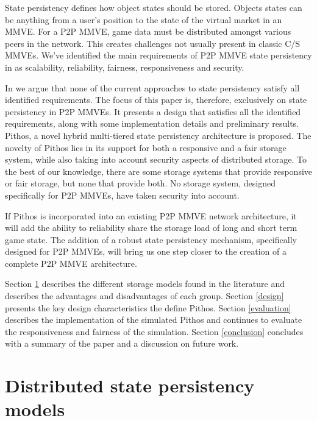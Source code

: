 \documentclass[10pt,a4paper,conference]{IEEEtran}
\begin{document}
State persistency defines how object states should be stored. Objects states can be anything from a user's position to the state of the virtual
market in an MMVE. For a P2P MMVE, game data must be distributed amongst various peers in the network. This creates challenges not usually present in
classic C/S MMVEs. We've identified the main requirements of P2P MMVE state persistency in \cite{gilmore_p2p_mmog_state_persistency} as scalability,
reliability, fairness, responsiveness and security.

In \cite{gilmore_p2p_mmog_state_persistency} we argue that none of the current approaches to state persistency satisfy all identified requirements.
The focus of this paper is, therefore, exclusively on state persistency in P2P MMVEs. It presents a design that satisfies all the identified
requirements, along with some implementation details and preliminary results. Pithos, a novel hybrid multi-tiered state persistency architecture is
proposed. The novelty of Pithos lies in its support for both a responsive and a fair storage system, while also taking into account security aspects
of distributed storage. To the best of our knowledge, there are some storage systems that provide responsive or fair storage, but none that provide
both. No storage system, designed specifically for P2P MMVEs, have taken security into account.

If Pithos is incorporated into an existing P2P MMVE network architecture, it will add the ability to reliability share the storage load of long and
short term game state. The addition of a robust state persistency mechanism, specifically designed for P2P MMVEs, will bring us one step closer to
the creation of a complete P2P MMVE architecture.

Section \ref{current_models} describes the different storage models found in the literature and describes the advantages and disadvantages of each
group.
%
Section \ref{design} presents the key design characteristics the define Pithos.
%
Section \ref{evaluation} describes the implementation of the simulated Pithos and continues to evaluate the responsiveness and fairness of the
simulation.
%
Section \ref{conclusion} concludes with a summary of the paper and a discussion on future work.

\section{Distributed state persistency models}
\label{current_models}
\end{document}
